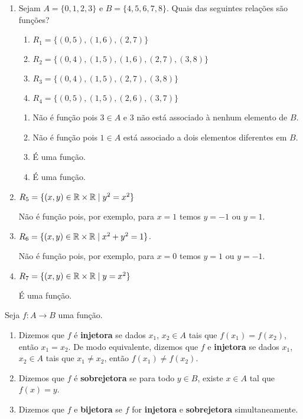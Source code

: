 \begin{exemplos}
	\begin{enumerate}[label={\arabic*})]
	\item Sejam $A = \{0,1,2,3\}$ e $B = \{4,5,6,7,8\}$. Quais das seguintes rela{\c c}{\~o}es s{\~a}o fun{\c c}{\~o}es?
	\begin{enumerate}[label={\alph*})]
		\item $R_1 = \{(0,5),(1,6),(2,7)\}$
		\item $R_2 = \{(0,4),(1,5),(1,6),(2,7),(3,8)\}$
		\item $R_3 = \{(0,4),(1,5),(2,7),(3,8)\}$
		\item $R_4 = \{(0,5),(1,5),(2,6),(3,7)\}$
	\end{enumerate}
	\begin{solucao}
		\begin{enumerate}[label={\alph*})]
			\item N\~ao \'e fun\c{c}\~ao pois $3 \in A$ e $3$ n\~ao est\'a associado {\`a} nenhum elemento de $B$.
			\item N\~ao \'e fun\c{c}\~ao pois $1 \in A$ est\'a associado a dois elementos diferentes em $B$.
			\item \'E uma fun\c{c}\~ao.
			\item \'E uma fun\c{c}\~ao.
		\end{enumerate}
	\end{solucao}
	\item $R_{5} = \{(x,y) \in \mathbb{R}  \times \mathbb{R}  \mid y^2 = x^2\}$
	\begin{solucao}
	 	N\~ao \'e fun\c{c}\~ao pois, por exemplo, para $x = 1$ temos $y = -1$ ou $y = 1$.
	 \end{solucao}
	\item $R_{6} = \{(x,y) \in \mathbb{R}  \times \mathbb{R}  \mid x^2 + y^2 = 1\}$.
	\begin{solucao}
	 	N\~ao \'e fun\c{c}\~ao pois, por exemplo, para $x = 0$ temos $y = 1$ ou $y = -1$.
	 \end{solucao}
	\item  $R_{7} = \{(x,y) \in \mathbb{R}  \times \mathbb{R} \mid y = x^2\}$
	\begin{solucao}
	 	\'E uma fun\c{c}\~ao.
	\end{solucao}
	\end{enumerate}	
\end{exemplos}


\begin{definicao}
	Seja $f : A \to B$ uma fun\c{c}\~ao.
	\begin{enumerate}[label={\roman*})]
		\item Dizemos que $f$ \'e \textbf{injetora} se dados $x_1$, $x_2 \in A$ tais que $f(x_1) = f(x_2)$, ent\~ao $x_1 = x_2$. De modo equivalente, dizemos que $f$ e \textbf{injetora} se dados $x_1$, $x_2 \in A$ tais que $x_1 \ne x_2$, ent\~ao $f(x_1) \ne f(x_2)$.
		\item Dizemos que $f$ \'e \textbf{sobrejetora} se para todo $y \in B$, existe $x \in A$ tal que $f(x) = y$.
		\item Dizemos que $f$ e \textbf{bijetora} se $f$ for \textbf{injetora} e \textbf{sobrejetora} simultaneamente.
	\end{enumerate}
\end{definicao}

